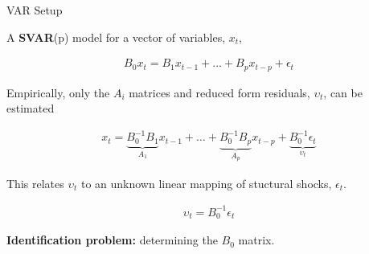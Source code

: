 \begin{frame}{VAR Setup}

A \textbf{SVAR}(p) model for a vector of variables, $x_t$,

\vspace{-1cm}
\begin{align*}
  B_0 x_t = B_1 x_{t-1} + \dots + B_p x_{t-p} + \epsilon_t
\end{align*}
\vspace{-1cm}

Empirically, only the $A_i$ matrices and reduced form residuals, $\upsilon_t$, can be estimated

\vspace{-1cm}
\begin{align*}
   x_t = \underbrace{B_0^{-1}B_1}_{A_1} x_{t-1} + \dots + \underbrace{B_0^{-1}B_p}_{A_p} x_{t-p} + \underbrace{B_0^{-1}\epsilon_t}_{\upsilon_t}
\end{align*}

This relates $\upsilon_t$ to an unknown linear mapping of stuctural shocks, $\epsilon_t$.

\vspace{-1cm}
\begin{align*}
   \upsilon_t = B_0^{-1} \epsilon_t
\end{align*}
\vspace{-1cm}

\textbf{Identification problem:} determining the $B_0$ matrix.

\end{frame}



